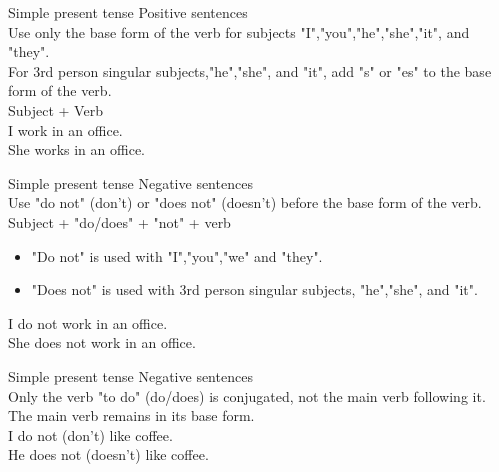 \documentclass{beamer}
\begin{document}
\begin{frame}{Simple present tense}
\centering
Positive sentences\\
\vspace{0.2in}
Use only the base form of the verb for subjects "I","you","he","she","it", and "they".\\
\vspace{0.2in}
For 3rd person singular subjects,"he","she", and "it", add "s" or "es" to the base form of the verb.\\
\vspace{0.3in}
Subject + Verb\\
\vspace{0.4in}
I work in an office.\\
She works in an office.\\    
\end{frame}

\begin{frame}{Simple present tense}
\centering
Negative sentences \\
\vspace{0.2in}
Use "do not" (don't) or "does not" (doesn't) before the base form of the verb.\\
\vspace{0.2in}
Subject + "do/does" + "not" + verb\\
\vspace{0.3in}
\begin{itemize}
\item[$\rightarrow$] "Do not" is used with "I","you","we" and "they".\\
\item[$\rightarrow$] "Does not" is used with 3rd person singular subjects, "he","she", and "it".\\
\end{itemize}

\vspace{0.4in}
I do not work in an office.\\
She does not work in an office.\\
\end{frame}

\begin{frame}{Simple present tense}
\centering
Negative sentences\\
\vspace{0.3in}
Only the verb "to do" (do/does) is conjugated, not the main verb following it.\\
The main verb remains in its base form.\\
\vspace{0.6in}
I do not (don't) like coffee.\\
He does not (doesn't) like coffee.
\end{frame}
\end{document}
